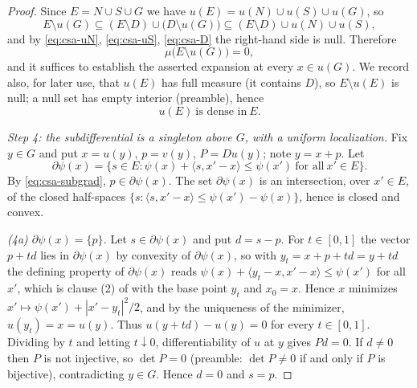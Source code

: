 \begin{proof}
Since $E=N\cup S\cup G$ we have $u(E)=u(N)\cup u(S)\cup u(G)$, so
\[
  E\setminus u(G)\subseteq(E\setminus D)\cup\bigl(D\setminus u(G)\bigr)
   \subseteq(E\setminus D)\cup u(N)\cup u(S),
\]
and by \eqref{eq:csa-uN}, \eqref{eq:csa-uS}, \eqref{eq:csa-D} the right-hand
side is null. Therefore
\begin{equation}\label{eq:csa-ae}
  \mu\bigl(E\setminus u(G)\bigr)=0,
\end{equation}
and it suffices to establish the asserted expansion at every $x\in u(G)$. We
record also, for later use, that $u(E)$ has full measure (it contains $D$), so
$E\setminus u(E)$ is null; a null set has empty interior (preamble), hence
\begin{equation}\label{eq:csa-dense}
  u(E)\ \text{is dense in}\ E .
\end{equation}

\emph{Step 4: the subdifferential is a singleton above $G$, with a uniform
localization.}
Fix $y\in G$ and put $x=u(y)$, $p=v(y)$, $P=Du(y)$; note $y=x+p$. Let
\[
  \partial\psi(x)=\bigl\{s\in E:\psi(x)+\langle s,x'-x\rangle\le\psi(x')
    \ \text{for all}\ x'\in E\bigr\}.
\]
By \eqref{eq:csa-subgrad}, $p\in\partial\psi(x)$. The set $\partial\psi(x)$ is
an intersection, over $x'\in E$, of the closed half-spaces
$\{s:\langle s,x'-x\rangle\le\psi(x')-\psi(x)\}$, hence is closed and convex.

\emph{(4a) $\partial\psi(x)=\{p\}$.} Let $s\in\partial\psi(x)$ and put
$d=s-p$. For $t\in[0,1]$ the vector $p+td$ lies in $\partial\psi(x)$ by
convexity of $\partial\psi(x)$, so with $y_t=x+p+td=y+td$ the defining property
of $\partial\psi(x)$ reads
$\psi(x)+\langle y_t-x,x'-x\rangle\le\psi(x')$ for all $x'$, which is clause (2)
of  with the base point $y_t$ and $x_0=x$. Hence
$x$ minimizes $x'\mapsto\psi(x')+|x'-y_t|^2/2$, and by the uniqueness of the
minimizer, $u(y_t)=x=u(y)$. Thus $u(y+td)-u(y)=0$ for every $t\in[0,1]$.
Dividing by $t$ and letting $t\downarrow0$, differentiability of $u$ at $y$
gives $Pd=0$. If $d\ne0$ then $P$ is not injective, so $\det P=0$ (preamble:
$\det P\ne0$ if and only if $P$ is bijective), contradicting $y\in G$. Hence
$d=0$ and $s=p$.


\end{proof}
